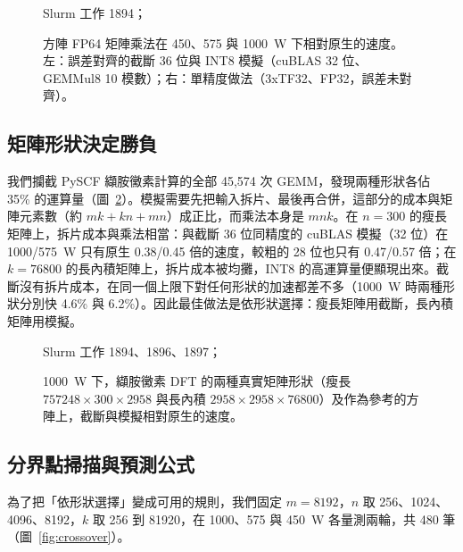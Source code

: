 \begin{figure}[tbp]
\centering
{}
\caption[方陣 FP64 矩陣乘法：截斷、INT8 模擬與單精度的比較]{方陣 FP64 矩陣乘法在 450、575 與 1000~W 下相對原生的速度。左：誤差對齊的截斷 36 位與 INT8 模擬（cuBLAS 32 位、GEMMul8 10 模數）；右：單精度做法（3xTF32、FP32，誤差未對齊）。}\label{fig:square}
\begin{figsource}Slurm 工作 1894；\end{figsource}
\end{figure}

\subsection{矩陣形狀決定勝負}\label{sec:crossover-shape}

我們攔截 PySCF 纈胺黴素計算的全部 45,574 次 GEMM，發現兩種形狀各佔 35\% 的運算量（圖~\ref{fig:shapes}）。模擬需要先把輸入拆片、最後再合併，這部分的成本與矩陣元素數（約 $mk + kn + mn$）成正比，而乘法本身是 $mnk$。在 $n = 300$ 的瘦長矩陣上，拆片成本與乘法相當：與截斷 36 位同精度的 cuBLAS 模擬（32 位）在 1000/575~W 只有原生 0.38/0.45 倍的速度，較粗的 28 位也只有 0.47/0.57 倍；在 $k = 76800$ 的長內積矩陣上，拆片成本被均攤，INT8 的高運算量便顯現出來。截斷沒有拆片成本，在同一個上限下對任何形狀的加速都差不多（1000~W 時兩種形狀分別快 4.6\% 與 6.2\%）。因此最佳做法是依形狀選擇：瘦長矩陣用截斷，長內積矩陣用模擬。

\begin{figure}[tbp]
\centering
{}
\caption[纈胺黴素的兩種真實矩陣形狀上截斷與模擬的速度]{1000~W 下，纈胺黴素 DFT 的兩種真實矩陣形狀（瘦長 $757248\times300\times2958$ 與長內積 $2958\times2958\times76800$）及作為參考的方陣上，截斷與模擬相對原生的速度。}\label{fig:shapes}
\begin{figsource}Slurm 工作 1894、1896、1897；\end{figsource}
\end{figure}

\subsection{分界點掃描與預測公式}\label{sec:crossover-sweep}

為了把「依形狀選擇」變成可用的規則，我們固定 $m = 8192$，$n$ 取 256、1024、4096、8192，$k$ 取 256 到 81920，在 1000、575 與 450~W 各量測兩輪，共 480 筆（圖~\ref{fig:crossover}）。

